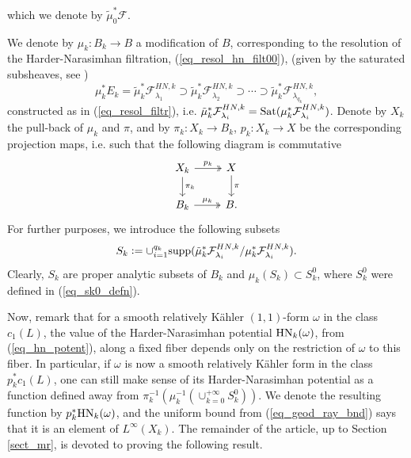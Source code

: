 \documentclass[12pt]{article}
\numberwithin{equation}{section}
\theoremstyle{theorem}
\theoremstyle{definition}
\theoremstyle{remark}
\begin{document}
	which we denote by $\tilde{\mu}_0^* \mathcal{F}$.
	\par 
	We denote by $\mu_k : B_k \to B$ a modification of $B$, corresponding to the resolution of the Harder-Narasimhan filtration, (\ref{eq_resol_hn_filt00}), (given by the saturated subsheaves, see \cite[Lemma 5.7.5]{KobaVB})
	\begin{equation}\label{eq_resol_hn_filt}
		\mu_k^* E_k = \tilde{\mu}_k^* \mathcal{F}^{HN, k}_{\lambda_1} \supset \tilde{\mu}_k^* \mathcal{F}^{HN, k}_{\lambda_2} \supset \cdots \supset \tilde{\mu}_k^* \mathcal{F}^{HN, k}_{\lambda_{q_k}},
	\end{equation}
	constructed as in (\ref{eq_resol_filtr}), i.e. $\tilde{\mu}_k^* \mathcal{F}^{HN, k}_{\lambda_i} = {\rm{Sat}}(\mu_k^* \mathcal{F}^{HN, k}_{\lambda_i})$. 
	Denote by $X_k$ the pull-back of $\mu_k$ and $\pi$, and by $\pi_k : X_k \to B_k$, $p_k : X_k \to X$ be the corresponding projection maps, i.e. such that the following diagram is commutative
	\begin{equation}\label{eq_sh_exct_seq}
	\begin{tikzcd}
		X_k \arrow[twoheadrightarrow]{r}{p_k} \arrow{d}{\pi_k} & X \arrow{d}{\pi} \\
 		B_k \arrow[twoheadrightarrow]{r}{\mu_k} & B.
	\end{tikzcd}
	\end{equation}
	For further purposes, we introduce the following subsets
	\begin{equation}\label{eq_sk_defn}
		S_k := \cup_{i = 1}^{q_k} {\rm{supp}}(\tilde{\mu}_k^* \mathcal{F}^{HN, k}_{\lambda_i} / \mu_k^* \mathcal{F}^{HN, k}_{\lambda_i} ).
	\end{equation}
	Clearly, $S_k$ are proper analytic subsets of $B_k$ and $\mu_k (S_k) \subset S_k^0$, where $S_k^0$ were defined in (\ref{eq_sk0_defn}).
	\par 
	Now, remark that for a smooth relatively Kähler $(1, 1)$-form $\omega$ in the class $c_1(L)$, the value of the Harder-Narasimhan potential ${\rm{HN}}_k(\omega)$, from (\ref{eq_hn_potent}), along a fixed fiber depends only on the restriction of $\omega$ to this fiber.
	In particular, if $\omega$ is now a smooth relatively Kähler form in the class $p_k^* c_1(L)$, one can still make sense of its Harder-Narasimhan potential as a function defined away from $\pi_k^{-1}(\mu_k^{-1}(\cup_{k = 0}^{+\infty} S_k^0))$.
	We denote the resulting function by $p_k^* {\rm{HN}}_k(\omega)$, and the uniform bound from (\ref{eq_geod_ray_bnd}) says that it is an element of $L^{\infty}(X_k)$.
	The remainder of the article, up to Section \ref{sect_mr}, is devoted to proving the following result.
\end{document}
